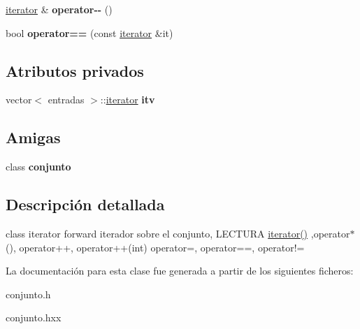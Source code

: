 \begin{DoxyCompactItemize}
\item 
\hypertarget{classconjunto_1_1iterator_a8a1050331902395fa3f13211ee23c4e1}{}\hyperlink{classconjunto_1_1iterator}{iterator} \& {\bfseries operator-\/-\/} ()\label{classconjunto_1_1iterator_a8a1050331902395fa3f13211ee23c4e1}

\item 
\hypertarget{classconjunto_1_1iterator_a771856bc966ec46b19f4756592cb084c}{}bool {\bfseries operator==} (const \hyperlink{classconjunto_1_1iterator}{iterator} \&it)\label{classconjunto_1_1iterator_a771856bc966ec46b19f4756592cb084c}

\end{DoxyCompactItemize}
\subsection*{Atributos privados}
\begin{DoxyCompactItemize}
\item 
\hypertarget{classconjunto_1_1iterator_a9441b6a1b6a7573f6601a15fda3a92bc}{}vector$<$ entradas $>$\+::\hyperlink{classconjunto_1_1iterator}{iterator} {\bfseries itv}\label{classconjunto_1_1iterator_a9441b6a1b6a7573f6601a15fda3a92bc}

\end{DoxyCompactItemize}
\subsection*{Amigas}
\begin{DoxyCompactItemize}
\item 
\hypertarget{classconjunto_1_1iterator_a42fdcda39c77eabd7380e29fcdbe5dd2}{}class {\bfseries conjunto}\label{classconjunto_1_1iterator_a42fdcda39c77eabd7380e29fcdbe5dd2}

\end{DoxyCompactItemize}


\subsection{Descripción detallada}
class iterator forward iterador sobre el conjunto, L\+E\+C\+T\+U\+R\+A \hyperlink{classconjunto_1_1iterator_ae3ade272e78f6888c39ad44a8b4b152a}{iterator()} ,operator$\ast$(), operator++, operator++(int) operator=, operator==, operator!= 

La documentación para esta clase fue generada a partir de los siguientes ficheros\+:\begin{DoxyCompactItemize}
\item 
conjunto.\+h\item 
conjunto.\+hxx\end{DoxyCompactItemize}
